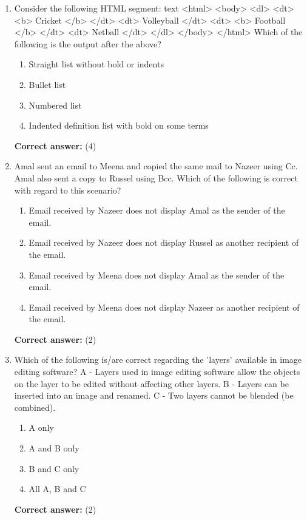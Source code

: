 \documentclass[12pt]{article}
\begin{document}
\begin{enumerate}[label=Q\arabic*:,leftmargin=*,resume]
\item Consider the following HTML segment: text <html> <body> <dl> <dt> <b> Cricket </b> </dt> <dt> Volleyball </dt> <dt> <b> Football </b> </dt> <dt> Netball </dt> </dl> </body> </html> Which of the following is the output after the above?\\
\begin{enumerate}[label=(\arabic*)]
\item Straight list without bold or indents
\item Bullet list
\item Numbered list
\item Indented definition list with bold on some terms
\end{enumerate}
\textbf{Correct answer:} (4)

\item Amal sent an email to Meena and copied the same mail to Nazeer using Cc. Amal also sent a copy to Russel using Bcc. Which of the following is correct with regard to this scenario?\\
\begin{enumerate}[label=(\arabic*)]
\item Email received by Nazeer does not display Amal as the sender of the email.
\item Email received by Nazeer does not display Russel as another recipient of the email.
\item Email received by Meena does not display Amal as the sender of the email.
\item Email received by Meena does not display Nazeer as another recipient of the email.
\end{enumerate}
\textbf{Correct answer:} (2)

\item Which of the following is/are correct regarding the 'layers' available in image editing software? A - Layers used in image editing software allow the objects on the layer to be edited without affecting other layers. B - Layers can be inserted into an image and renamed. C - Two layers cannot be blended (be combined).\\
\begin{enumerate}[label=(\arabic*)]
\item A only
\item A and B only
\item B and C only
\item All A, B and C
\end{enumerate}
\textbf{Correct answer:} (2)


\end{enumerate}
\end{document}
